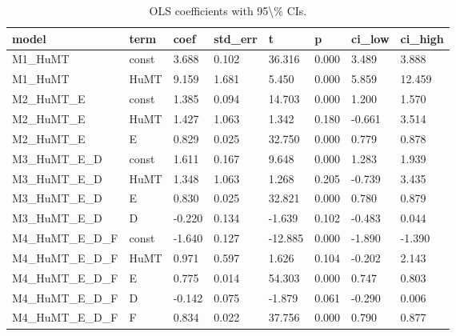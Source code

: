 \begin{table}[t]
\centering
\caption{OLS coefficients with 95\textbackslash{}\% CIs.}
\label{tab:ols_coefs}
\begin{tabular}{llllllll}
\toprule
model & term & coef & std\_err & t & p & ci\_low & ci\_high \\
\midrule
M1\_HuMT & const & 3.688 & 0.102 & 36.316 & 0.000 & 3.489 & 3.888 \\
M1\_HuMT & HuMT & 9.159 & 1.681 & 5.450 & 0.000 & 5.859 & 12.459 \\
M2\_HuMT\_E & const & 1.385 & 0.094 & 14.703 & 0.000 & 1.200 & 1.570 \\
M2\_HuMT\_E & HuMT & 1.427 & 1.063 & 1.342 & 0.180 & -0.661 & 3.514 \\
M2\_HuMT\_E & E & 0.829 & 0.025 & 32.750 & 0.000 & 0.779 & 0.878 \\
M3\_HuMT\_E\_D & const & 1.611 & 0.167 & 9.648 & 0.000 & 1.283 & 1.939 \\
M3\_HuMT\_E\_D & HuMT & 1.348 & 1.063 & 1.268 & 0.205 & -0.739 & 3.435 \\
M3\_HuMT\_E\_D & E & 0.830 & 0.025 & 32.821 & 0.000 & 0.780 & 0.879 \\
M3\_HuMT\_E\_D & D & -0.220 & 0.134 & -1.639 & 0.102 & -0.483 & 0.044 \\
M4\_HuMT\_E\_D\_F & const & -1.640 & 0.127 & -12.885 & 0.000 & -1.890 & -1.390 \\
M4\_HuMT\_E\_D\_F & HuMT & 0.971 & 0.597 & 1.626 & 0.104 & -0.202 & 2.143 \\
M4\_HuMT\_E\_D\_F & E & 0.775 & 0.014 & 54.303 & 0.000 & 0.747 & 0.803 \\
M4\_HuMT\_E\_D\_F & D & -0.142 & 0.075 & -1.879 & 0.061 & -0.290 & 0.006 \\
M4\_HuMT\_E\_D\_F & F & 0.834 & 0.022 & 37.756 & 0.000 & 0.790 & 0.877 \\
\bottomrule
\end{tabular}
\end{table}

